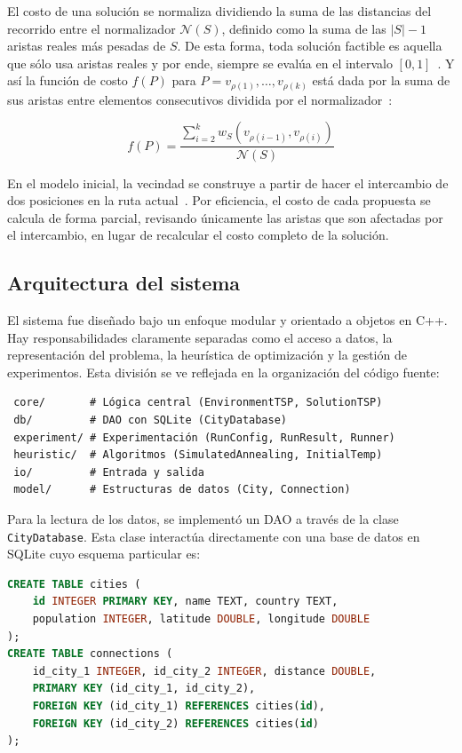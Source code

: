 \documentclass[9pt,a4paper,twocolumn,twoside]{rho-class/rho}
\begin{document}
El costo de una solución se normaliza dividiendo la suma de las distancias del recorrido entre 
el normalizador $\mathcal{N}(S)$, definido como la suma de las $|S|-1$ aristas reales más pesadas
de $S$. De esta forma, toda solución factible es aquella que sólo usa aristas reales y por ende,
siempre se evalúa en el intervalo $[0,1]$~\cite{cursoHeuristicas}. Y así la función de costo
$f(P)$ para $P = v_{\rho(1)}, \dots, v_{\rho(k)}$ está dada por la suma de sus aristas entre
elementos consecutivos dividida por el normalizador~\cite{cursoHeuristicas}:

$$
    f(P) = \frac{\sum_{i=2}^{k} w_S(v_{\rho(i-1)}, v_{\rho(i)})}{\mathcal{N}(S)}
$$

En el modelo inicial, la vecindad se construye a partir de hacer el intercambio de dos
posiciones en la ruta actual~\cite{cursoHeuristicas}. Por eficiencia, el costo de cada propuesta
se calcula de forma parcial, revisando únicamente las aristas que son afectadas por el
intercambio, en lugar de recalcular el costo completo de la solución.
 
\subsection{Arquitectura del sistema}
El sistema fue diseñado bajo un enfoque modular y orientado a objetos en C++. Hay
responsabilidades claramente separadas como el acceso a datos, la representación del problema,
la heurística de optimización y la gestión de experimentos. Esta división se ve reflejada en la
organización del código fuente:
\begin{verbatim}
 core/       # Lógica central (EnvironmentTSP, SolutionTSP)
 db/         # DAO con SQLite (CityDatabase)
 experiment/ # Experimentación (RunConfig, RunResult, Runner)
 heuristic/  # Algoritmos (SimulatedAnnealing, InitialTemp)
 io/         # Entrada y salida
 model/      # Estructuras de datos (City, Connection)
\end{verbatim}

Para la lectura de los datos, se implementó un DAO a través de la clase \texttt{CityDatabase}.
Esta clase interactúa directamente con una base de datos en SQLite cuyo esquema particular es:

\begin{lstlisting}[language=SQL, caption={Esquema relacional de la base de datos.}]
CREATE TABLE cities (
    id INTEGER PRIMARY KEY, name TEXT, country TEXT,
    population INTEGER, latitude DOUBLE, longitude DOUBLE
);
CREATE TABLE connections (
    id_city_1 INTEGER, id_city_2 INTEGER, distance DOUBLE,
    PRIMARY KEY (id_city_1, id_city_2),
    FOREIGN KEY (id_city_1) REFERENCES cities(id),
    FOREIGN KEY (id_city_2) REFERENCES cities(id)
);
\end{lstlisting}
\end{document}
